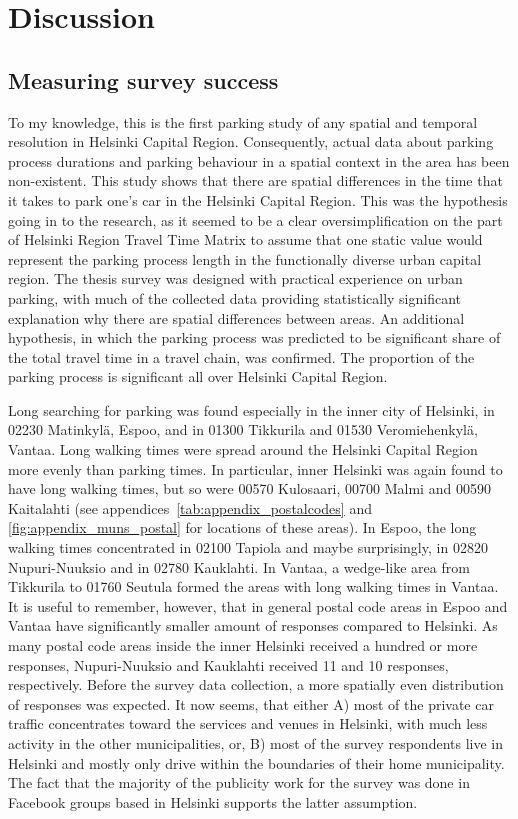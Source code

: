 \section{Discussion}
\label{sec:c5-discussion} %
\subsection{Measuring survey success}
\justify

To my knowledge, this is the first parking study of any spatial and temporal resolution in Helsinki Capital Region. Consequently, actual data about parking process durations and parking behaviour in a spatial context in the area has been non-existent. This study shows that there are spatial differences in the time that it takes to park one's car in the Helsinki Capital Region. This was the hypothesis going in to the research, as it seemed to be a clear oversimplification on the part of Helsinki Region Travel Time Matrix to assume that one static value would represent the parking process length in the functionally diverse urban capital region. The thesis survey was designed with practical experience on urban parking, with much of the collected data providing statistically significant explanation why there are spatial differences between areas. An additional hypothesis, in which the parking process was predicted to be significant share of the total travel time in a travel chain, was confirmed. The proportion of the parking process is significant all over Helsinki Capital Region.

Long searching for parking was found especially in the inner city of Helsinki, in 02230 Matinkylä, Espoo, and in 01300 Tikkurila and  01530 Veromiehenkylä, Vantaa. Long walking times were spread around the Helsinki Capital Region more evenly than parking times. In particular, inner Helsinki was again found to have long walking times, but so were 00570 Kulosaari, 00700 Malmi and 00590 Kaitalahti (see appendices~\ref{tab:appendix_postalcodes} and \ref{fig:appendix_muns_postal} for locations of these areas). In Espoo, the long walking times concentrated in 02100 Tapiola and maybe surprisingly, in 02820 Nupuri-Nuuksio and in 02780 Kauklahti. In Vantaa, a wedge-like area from Tikkurila to 01760 Seutula formed the areas with long walking times in Vantaa. It is useful to remember, however, that in general postal code areas in Espoo and Vantaa have significantly smaller amount of responses compared to Helsinki. As many postal code areas inside the inner Helsinki received a hundred or more responses, Nupuri-Nuuksio and Kauklahti received 11 and 10 responses, respectively. Before the survey data collection, a more spatially even distribution of responses was expected. It now seems, that either A) most of the private car traffic concentrates toward the services and venues in Helsinki, with much less activity in the other municipalities, or, B) most of the survey respondents live in Helsinki and mostly only drive within the boundaries of their home municipality. The fact that the majority of the publicity work for the survey was done in Facebook groups based in Helsinki supports the latter assumption.

